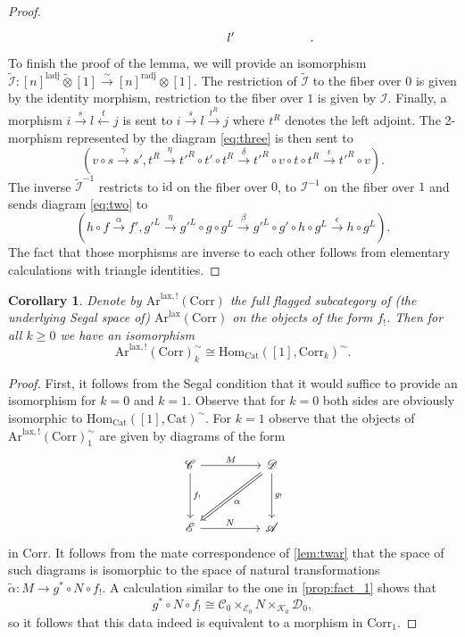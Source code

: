 \documentclass[a4paper, reqno]{amsart}
\newtheorem{cor}[theorem]{Corollary}
\theoremstyle{definition}
\newcommand\cA{\mathscr A}
\newcommand\cC{\mathscr C}
\newcommand\cD{\mathscr D}
\newcommand\cE{\mathscr E}
\newcommand\cI{\mathscr I}
\newcommand\cK{\mathscr K}
\newcommand\id{\mathrm{id}}
\newcommand\mor{\mathrm{Hom}}
\newcommand\cat{\mathrm{Cat}}
\newcommand\arr{\mathrm{Ar}}
\newcommand\corr{\mathrm{Corr}}
\newcommand\lax{\mathrm{lax}}
\newcommand\ladj{\mathrm{ladj}}
\newcommand\radj{\mathrm{radj}}
\begin{document}
\begin{proof}
\begin{equation}
\begin{tikzcd}[row sep=huge, column sep=huge]
    {}&l'&{}
    \end{tikzcd}.
\end{equation}
To finish the proof of the lemma, we will provide an isomorphism $\widetilde{\cI}:[n]^\ladj\widetilde{\otimes}[1]\xrightarrow{\sim}[n]^\radj\otimes[1]$. The restriction of $\widetilde{\cI}$ to the fiber over $0$ is given by the identity morphism, restriction to the fiber over $1$ is given by $\cI$. Finally, a morphism $i\xrightarrow{s}l\xleftarrow{t}j$ is sent to $i\xrightarrow{s}l\xrightarrow{t^R}j$ where $t^R$ denotes the left adjoint. The 2-morphism represented by the diagram \ref{eq:three} is then sent to 
\[(v\circ s\xrightarrow{\gamma}s', t^R\xrightarrow{\eta}t'^R\circ t'\circ t^R\xrightarrow{\delta}t'^R\circ v\circ t\circ t^R\xrightarrow{\epsilon}t'^R\circ v).\] The inverse $\widetilde{\cI}^{-1}$ restricts to $\id$ on the fiber over $0$, to $\cI^{-1}$ on the fiber over $1$ and sends diagram \ref{eq:two} to 
\[(h\circ f\xrightarrow{\alpha}f',g'^L\xrightarrow{\eta}g'^L\circ g\circ g^L\xrightarrow{\beta}g'^L\circ g'\circ h\circ g^L\xrightarrow{\epsilon}h\circ g^L).\]
The fact that those morphisms are inverse to each other follows from elementary calculations with triangle identities. 
\end{proof}
\begin{cor}\label{cor:lax_adj}
Denote by $\arr^{\lax,!}(\corr)$ the full flagged subcategory of (the underlying Segal space of) $\arr^\lax(\corr)$ on the objects of the form $f_!$. Then for all $k\geq0$ we have an isomorphism 
\[\arr^{\lax,!}(\corr)^\sim_k\cong\mor_\cat([1],\corr_k)^\sim.\]
\end{cor}
\begin{proof}
First, it follows from the Segal condition that it would suffice to provide an isomorphism for $k=0$ and $k=1$. Observe that for $k=0$ both sides are obviously isomorphic to $\mor_\cat([1],\cat)^\sim$. For $k=1$ observe that the objects of $\arr^{\lax,!}(\corr)^\sim_1$ are given by diagrams of the form 
\[
\begin{tikzcd}[row sep=huge, column sep=huge]
\cC\arrow[r, "M"]\arrow[d, "f_!"]&\cD\arrow[d, "g_!"]\arrow[dl, Rightarrow, "\alpha"]\\
\cE\arrow[r, "N"]&\cA
\end{tikzcd}
\]
in $\corr$. It follows from the mate correspondence of \cref{lem:twar} that the space of such diagrams is isomorphic to the space 
of natural transformations $\widetilde{\alpha}:M\rightarrow g^*\circ N\circ f_!$. A calculation similar to the one in \cref{prop:fact_1} shows that 
\[g^*\circ N\circ f_!\cong \cC_0\times_{\cE_0}N\times_{\cK_0}\cD_0,\]
so it follows that this data indeed is equivalent to a morphism in $\corr_1$.
\end{proof}
\end{document}
